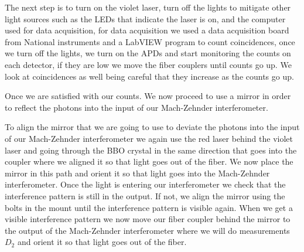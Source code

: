 \documentclass[12pt]{book}
\begin{document}
The next step is to turn on the violet laser, turn off the lights to mitigate other light sources such as the LEDs that indicate the laser is on, and the computer used for data acquisition, for data acquisition we used a data acquisition board from National instruments and a LabVIEW program to count coincidences, once we turn off the lights, we turn on the APDs and start monitoring the counts on each detector, if they are low we move the fiber couplers until counts go up. We look at coincidences as well being careful that they increase as the counts go up.

Once we are satisfied with our counts. We now proceed to use a mirror in order to reflect the photons into the input of our Mach-Zehnder interferometer.


To align the mirror that we are going to use to deviate the photons into the input of our Mach-Zehnder interferometer we again use the red laser behind the violet laser and going through the BBO crystal in the same direction that goes into the coupler where we aligned it so that light goes out of the fiber. We now place the mirror in this path and orient it so that light goes into the Mach-Zehnder interferometer. Once the light is entering our interferometer we check that the interference pattern is still in the output. If not, we align the mirror using the bolts in the mount until the interference pattern is visible again. When we get a visible interference pattern we now move our fiber coupler behind the mirror to the output of the Mach-Zehnder interferometer where we will do measurements $D_{2}$ and orient it so that light goes out of the fiber. 
\end{document}
